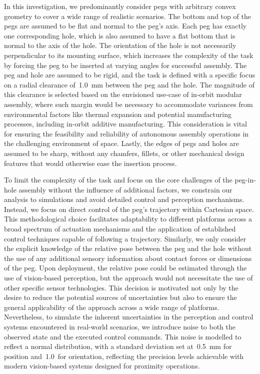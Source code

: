 In this investigation, we predominantly consider pegs with arbitrary convex geometry to cover a wide range of realistic scenarios. The bottom and top of the pegs are assumed to be flat and normal to the peg's axis. Each peg has exactly one corresponding hole, which is also assumed to have a flat bottom that is normal to the axis of the hole. The orientation of the hole is not necessarily perpendicular to its mounting surface, which increases the complexity of the task by forcing the peg to be inserted at varying angles for successful assembly. The peg and hole are assumed to be rigid, and the task is defined with a specific focus on a radial clearance of~1.0~mm between the peg and the hole. The magnitude of this clearance is selected based on the envisioned use-case of in-orbit modular assembly, where such margin would be necessary to accommodate variances from environmental factors like thermal expansion and potential manufacturing processes, including in-orbit additive manufacturing. This consideration is vital for ensuring the feasibility and reliability of autonomous assembly operations in the challenging environment of space. Lastly, the edges of pegs and holes are assumed to be sharp, without any chamfers, fillets, or other mechanical design features that would otherwise ease the insertion process.

To limit the complexity of the task and focus on the core challenges of the peg-in-hole assembly without the influence of additional factors, we constrain our analysis to simulations and avoid detailed control and perception mechanisms. Instead, we focus on direct control of the peg's trajectory within Cartesian space. This methodological choice facilitates adaptability to different platforms across a broad spectrum of actuation mechanisms and the application of established control techniques capable of following a trajectory. Similarly, we only consider the explicit knowledge of the relative pose between the peg and the hole without the use of any additional sensory information about contact forces or dimensions of the peg. Upon deployment, the relative pose could be estimated through the use of vision-based perception, but the approach would not necessitate the use of other specific sensor technologies. This decision is motivated not only by the desire to reduce the potential sources of uncertainties but also to ensure the general applicability of the approach across a wide range of platforms. Nevertheless, to simulate the inherent uncertainties in the perception and control systems encountered in real-world scenarios, we introduce noise to both the observed state and the executed control commands. This noise is modelled to reflect a normal distribution, with a standard deviation set at~0.5~mm for position and~1.0\textdegree\ for orientation, reflecting the precision levels achievable with modern vision-based systems designed for proximity operations.


